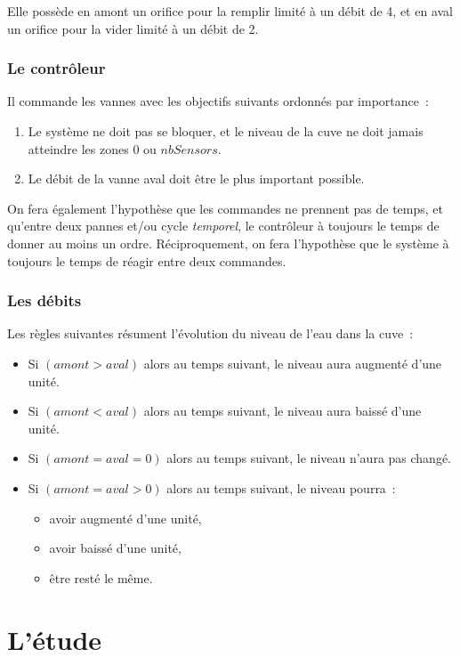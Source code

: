 Elle possède en amont un orifice pour la remplir limité à un débit de 4, et en aval un orifice pour la vider limité à un débit de 2.  

\subsubsection{Le contrôleur}
Il commande les vannes avec les objectifs suivants ordonnés par importance~:
\begin{enumerate}
\item Le système ne doit pas se bloquer, et le niveau de la cuve ne doit jamais atteindre les zones 0 ou $nbSensors$.
\item Le débit de la vanne aval doit être le plus important possible.
\end{enumerate}

On fera également l'hypothèse que les commandes ne prennent pas de temps, et qu'entre deux pannes et/ou cycle {\em temporel}, le contrôleur à toujours le temps de donner au moins un ordre. Réciproquement, on fera l'hypothèse que le système à toujours le temps de réagir entre deux commandes.

\subsubsection{Les débits}
Les règles suivantes résument l'évolution du niveau de l'eau dans la cuve~:
\begin{itemize}
\item Si $(amont > aval)$ alors au temps suivant, le niveau aura augmenté d'une unité.
\item Si $(amont < aval)$ alors au temps suivant, le niveau aura baissé d'une unité.
\item Si $(amont = aval = 0)$ alors au temps suivant, le niveau n'aura pas changé.
\item Si $(amont = aval > 0)$ alors au temps suivant, le niveau pourra~:
  \begin{itemize}
  \item avoir augmenté d'une unité,
  \item avoir baissé d'une unité,
  \item être resté le même.
  \end{itemize}
\end{itemize}

\section{L'étude}


